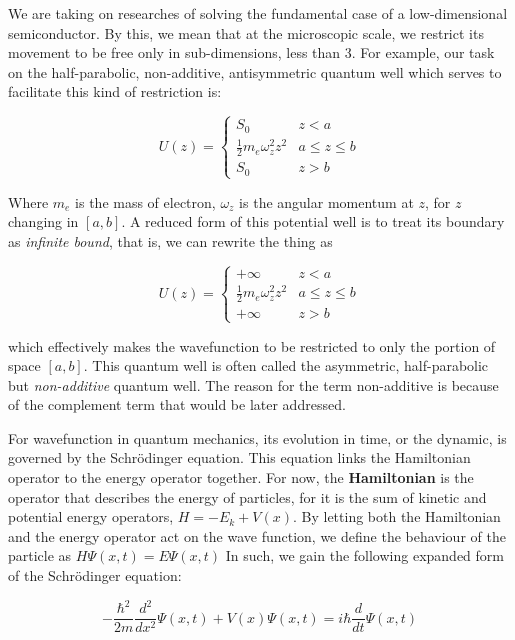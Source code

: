 We are taking on researches of solving the fundamental case of a low-dimensional semiconductor. By this, we mean that at the microscopic scale, we restrict its movement to be free only in sub-dimensions, less than 3. For example, our task on the half-parabolic, non-additive, antisymmetric quantum well which serves to facilitate this kind of restriction is: 

\begin{equation}
    U(z)=\begin{cases}
S_{0} & z < a \\
\displaystyle{\frac{1}{2}m_{e}\omega_{z}^{2}z^{2}} & a \leq z \leq b \\
S_{0} & z > b
\end{cases}
\end{equation}

Where $m_{e}$ is the mass of electron, $\omega_{z}$ is the angular momentum at $z$, for $z$ changing in $[a,b]$. A reduced form of this potential well is to treat its boundary as \textit{infinite bound}, that is, we can rewrite the thing as 

\begin{equation}
    U(z)=\begin{cases}
+\infty & z < a \\
\displaystyle{\frac{1}{2}m_{e}\omega_{z}^{2}z^{2}} & a \leq z \leq b \\
+\infty& z > b
\end{cases}
\end{equation}

which effectively makes the wavefunction to be restricted to only the portion of space $[a,b]$. This quantum well is often called the asymmetric, half-parabolic but \textit{non-additive} quantum well. The reason for the term non-additive is because of the complement term that would be later addressed. 

For wavefunction in quantum mechanics, its evolution in time, or the dynamic, is governed by the Schrödinger equation. This equation links the Hamiltonian operator to the energy operator together. For now, the \textbf{Hamiltonian} is the operator that describes the energy of particles, for it is the sum of kinetic and potential energy operators, $H=-E_{k}+V(x)$. By letting both the Hamiltonian and the energy operator act on the wave function, we define the behaviour of the particle as $H\Psi(x,t)=E\Psi(x,t)$ In such, we gain the following expanded form of the Schrödinger equation: 

$$-\frac{\hbar^{2}}{2m} \frac{d^{2}}{dx^{2}}\Psi(x,t)+V(x)\Psi(x,t)=i\hbar \frac{d}{dt}\Psi(x,t)$$

